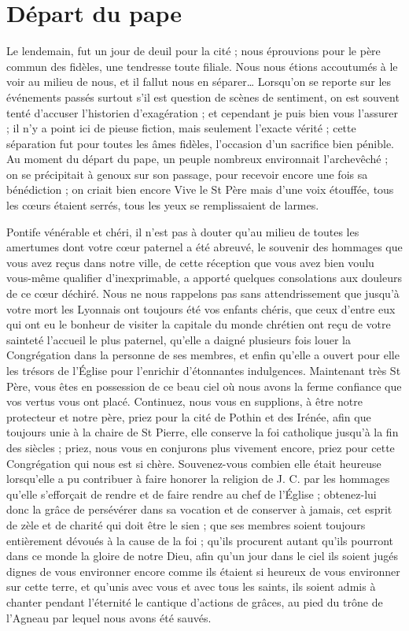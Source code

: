 \section*{Départ du pape}
Le lendemain, fut un jour de deuil pour la cité ; nous éprouvions pour le père commun des fidèles, une tendresse toute filiale. Nous nous étions accoutumés à le voir au milieu de nous, et il fallut nous en séparer… Lorsqu'on se reporte sur les événements passés surtout s'il est question de scènes de sentiment, on est souvent tenté d'accuser l'historien d'exagération ; et cependant je puis bien vous l'assurer ; il n'y a point ici de pieuse fiction, mais seulement l'exacte vérité ; cette séparation fut pour toutes les âmes fidèles, l'occasion d'un sacrifice bien pénible. Au moment du départ du pape, un peuple nombreux environnait l'archevêché ; on se précipitait à genoux sur son passage, pour recevoir encore une fois sa bénédiction ; on criait bien encore Vive le St Père mais d'une voix étouffée, tous les cœurs étaient serrés, tous les yeux se remplissaient de larmes.

Pontife vénérable et chéri, il n'est pas à douter qu'au milieu de toutes les amertumes dont votre cœur paternel a été abreuvé, le souvenir des hommages que vous avez reçus dans notre ville, de cette réception que vous avez bien voulu vous-même qualifier d'inexprimable, a apporté quelques consolations aux
douleurs de ce cœur déchiré. Nous ne nous rappelons pas sans attendrissement que jusqu'à votre mort les Lyonnais ont toujours été vos enfants chéris, que ceux d'entre eux qui ont eu le bonheur de visiter la capitale du monde chrétien ont reçu de votre sainteté l'accueil le plus paternel, qu'elle a daigné plusieurs fois louer la Congrégation dans la personne de ses membres, et enfin qu'elle a ouvert pour elle les trésors de l'Église pour l'enrichir d'étonnantes indulgences. Maintenant très St Père, vous êtes en possession de ce beau ciel où nous avons la ferme confiance que vos vertus vous ont placé. Continuez, nous vous en supplions, à être notre protecteur et notre père, priez pour la cité de Pothin et des Irénée, afin que toujours unie à la chaire de St Pierre, elle conserve la foi catholique jusqu'à la fin des siècles ; priez, nous vous en conjurons plus vivement encore, priez pour cette Congrégation qui nous est si chère. Souvenez-vous combien elle était heureuse lorsqu'elle a pu contribuer à faire honorer la religion de J. C. par les hommages qu'elle s'efforçait de rendre et de faire rendre au chef de l'Église ; obtenez-lui donc la grâce de persévérer dans sa vocation et de conserver à jamais, cet esprit de zèle et de charité qui doit être le sien ; que ses membres soient toujours entièrement dévoués à la cause de la foi ; qu'ils procurent autant qu'ils pourront dans ce monde la gloire de notre Dieu, afin qu'un jour dans le ciel ils soient jugés dignes de vous environner encore comme ils étaient si heureux de vous environner sur cette terre, et qu'unis avec vous et avec tous les saints, ils soient admis à chanter pendant l'éternité le cantique d'actions de grâces, au pied du trône de l'Agneau par lequel nous avons été sauvés.

